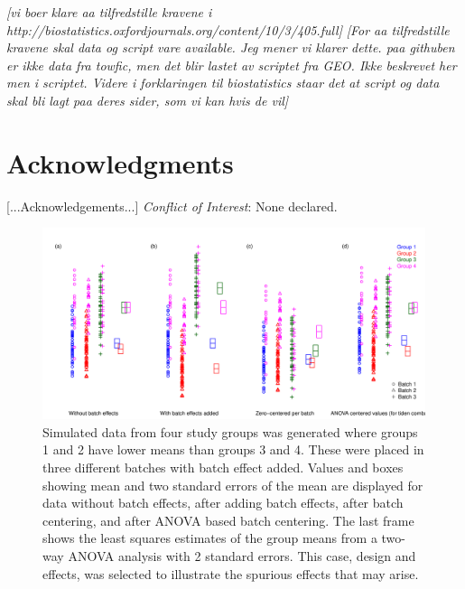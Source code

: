 \documentclass{bio}
\newcommand\NB[1]{\textcolor{NBcol}{\textit{#1}}}
\newcommand\NOTE[1]{\NB{[#1]}}
\begin{document}
\NOTE{vi boer klare aa tilfredstille kravene i http://biostatistics.oxfordjournals.org/content/10/3/405.full}
\NOTE{For aa tilfredstille kravene skal data og script vare available. Jeg mener vi klarer dette. paa githuben er ikke data fra towfic, men det blir lastet av scriptet fra GEO. Ikke beskrevet her men i scriptet. Videre i forklaringen til biostatistics staar det at script og data skal bli lagt paa deres sider, som vi kan hvis de vil}



\section*{Acknowledgments}

[...Acknowledgements...]
{\it Conflict of Interest}: None declared.




%



\begin{figure}[!p]
\centering\includegraphics[width=13cm]{Fig/boxplots.pdf}
\caption{Simulated data from four study groups was generated where groups 1 and 2 have lower means than groups 3 and 4. These were placed in three different batches with batch effect added. Values and boxes showing mean and two standard errors of the mean are displayed for data without batch effects, after adding batch effects, after batch centering, and after ANOVA based batch centering. The last frame shows the least squares estimates of the group means from a two-way ANOVA analysis with 2 standard errors. This case, design and effects, was selected to illustrate the spurious effects that may arise.}
\label{fig:boxplots}
\end{figure}
\end{document}
